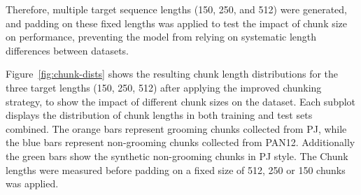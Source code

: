 Therefore, multiple target sequence lengths (150, 250, and 512) were generated, and padding on these fixed lengths was applied to test the impact of chunk size on performance, preventing the model from relying on systematic length differences between datasets.

Figure~\ref{fig:chunk-dists} shows the resulting chunk length distributions for the three target lengths (150, 250, 512) after applying the improved chunking strategy, to show the impact of different chunk sizes on the dataset. Each subplot displays the distribution of chunk lengths in both training and test sets combined. The orange bars represent grooming chunks collected from PJ, while the blue bars represent non-grooming chunks collected from PAN12. Additionally the green bars show the synthetic non-grooming chunks in PJ style. The Chunk lengths were measured before padding on a fixed size of 512, 250 or 150 chunks was applied.


